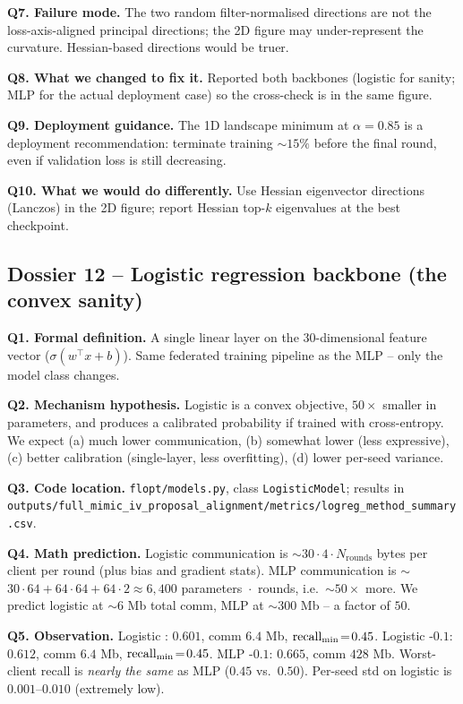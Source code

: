 \textbf{Q7. Failure mode.}
The two random filter-normalised directions are not the
loss-axis-aligned principal directions; the 2D figure may
under-represent the curvature. Hessian-based directions would be
truer.

\textbf{Q8. What we changed to fix it.}
Reported both backbones (logistic for sanity; MLP for the actual
deployment case) so the cross-check is in the same figure.

\textbf{Q9. Deployment guidance.}
The 1D landscape minimum at $\alpha\!=\!0.85$ is a deployment
recommendation: terminate training $\sim$$15\%$ before the final
round, even if validation loss is still decreasing.

\textbf{Q10. What we would do differently.}
Use Hessian eigenvector directions (Lanczos) in the 2D figure;
report Hessian top-$k$ eigenvalues at the best checkpoint.

\subsection{Dossier 12 -- Logistic regression backbone (the convex sanity)}
\label{sec:dossier-logistic}

\textbf{Q1. Formal definition.}
A single linear layer on the $30$-dimensional feature vector
($\sigma(w^\top x + b)$). Same federated training pipeline as the
MLP -- only the model class changes.

\textbf{Q2. Mechanism hypothesis.}
Logistic is a convex objective, $50\!\times$ smaller in parameters,
and produces a calibrated probability if trained with cross-entropy.
We expect (a) much lower communication, (b) somewhat lower \auprc{}
(less expressive), (c) better calibration (single-layer, less
overfitting), (d) lower per-seed variance.

\textbf{Q3. Code location.}
\texttt{flopt/models.py}, class \texttt{LogisticModel}; results in
\texttt{outputs/full\_mimic\_iv\_proposal\_alignment/metrics/logreg\_method\_summary.csv}.

\textbf{Q4. Math prediction.}
Logistic communication is $\sim$$30 \cdot 4 \cdot N_{\text{rounds}}$
bytes per client per round (plus bias and gradient stats). MLP
communication is $\sim$$30 \cdot 64 + 64 \cdot 64 + 64 \cdot 2 \approx
6{,}400$ parameters $\!\cdot\!$ rounds, i.e.\ $\sim$$50\!\times$ more.
We predict logistic at $\sim$$6$ Mb total comm, MLP at $\sim$$300$
Mb -- a factor of $50$.

\textbf{Q5. Observation.}
Logistic \fedavg{}: \auprc{} $0.601$, comm $6.4$ Mb, $\text{recall}_{\min}{}\!=\!
0.45$. Logistic \fedprox{}-$0.1$: \auprc{} $0.612$, comm $6.4$ Mb,
$\text{recall}_{\min}{}\!=\!0.45$. MLP \fedprox{}-$0.1$: \auprc{} $0.665$,
comm $428$ Mb. Worst-client recall is \emph{nearly the same} as MLP
($0.45$ vs.\ $0.50$). Per-seed std on logistic is $0.001$--$0.010$
(extremely low).


